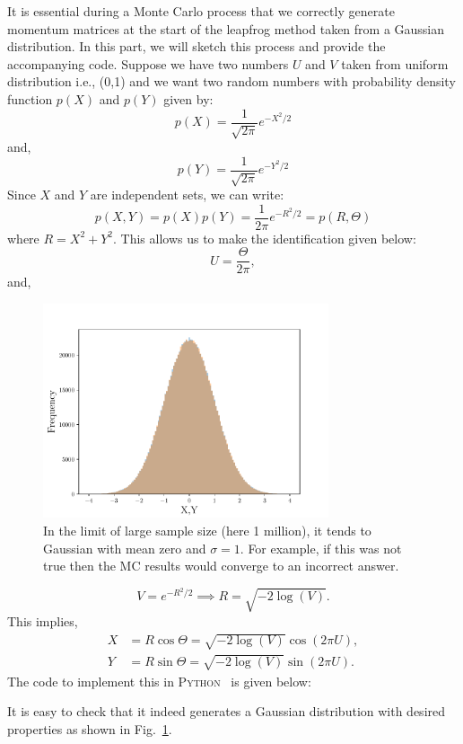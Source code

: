 \documentclass[11pt]{article}
\newcommand{\PY}{\textsc{Python}}
\begin{document}
It is essential during a Monte Carlo process that we correctly generate momentum matrices at the start of the leapfrog method taken from a Gaussian distribution. In this part, we will sketch this process and provide the accompanying code. 
Suppose we have two numbers $U$ and $V$ taken from uniform distribution i.e., (0,1) 
and we want two random numbers with probability density function $p(X)$ and $p(Y)$ given by:
\begin{equation}
	p(X) = \frac{1}{\sqrt{2\pi}} e^{-X^2/2} 
\end{equation}
and, 
\begin{equation}
	p(Y) = \frac{1}{\sqrt{2\pi}} e^{-Y^2/2} 
\end{equation}
Since $X$ and $Y$ are independent sets, we can write:
\begin{equation}
	p(X,Y) = p(X) p(Y) = \frac{1}{2\pi} e^{-R^2/2} = p(R, \Theta) 
\end{equation}
where $R = X^2 + Y^2$. This allows us to make the identification given below:
\begin{equation}
	U = \frac{\Theta}{2\pi}, 
\end{equation}
and, 

\begin{figure}[htbp] 
	\centering 
	\includegraphics[width=0.75\textwidth]{figs/testRN.pdf}
	\caption{\label{fig:RN}In the limit of large sample size (here 1 million), 
	it tends to Gaussian with mean zero and $\sigma=1$. For example, if 
	this was not true then the MC results would converge to an incorrect answer.}
\end{figure}
\begin{equation}
	V = e^{-R^2/2} \implies R = \sqrt{-2 \log(V)}. 
\end{equation}
This implies, 
\begin{align}
	X &= R \cos \Theta = \sqrt{-2 \log(V)} \cos(2 \pi U), \\
	Y &= R \sin \Theta = \sqrt{-2 \log(V)} \sin(2 \pi U).
\end{align}
The code to implement this in \PY~ is given below: 
\begin{mdframed}[backgroundcolor=mauve!3] 

\end{mdframed} 
It is easy to check that it indeed generates a 
Gaussian distribution with desired properties as shown in Fig.~\ref{fig:RN}. 
\end{document}

